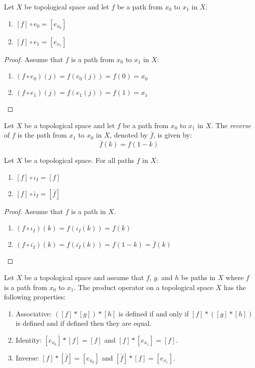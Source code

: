 \documentclass[letterpaper,12pt,fleqn]{article}
\renewcommand{\i}{\iota}
\begin{document}
\begin{lemma}
  Let \(X\) be topological space and let \(f\) be a path from \(x_0\) to \(x_1\) in \(X\):
  \begin{enumerate}
  \item \([f]\circ e_0=[e_{x_0}]\)
  \item \([f]\circ e_1=[e_{x_1}]\)
  \end{enumerate}
\end{lemma}

\begin{proof}
  Assume that \(f\) is a path from \(x_0\) to \(x_1\) in \(X\):
  \begin{enumerate}
    \item \((f\circ e_0)(j)=f(e_0(j))=f(0)=x_0\)
    \item \((f\circ e_1)(j)=f(e_1(j))=f(1)=x_1\)
  \end{enumerate}
\end{proof}

\begin{definition}[Reverse]
  Let \(X\) be a topological space and let \(f\) be a path from \(x_0\) to \(x_1\) in \(X\).  The \emph{reverse} of
  \(f\) is the path from \(x_1\) to \(x_0\) in \(X\), denoted by \(\bar{f}\), is given by:
  \[\bar{f}(k)=f(1-k)\]
\end{definition}

\begin{lemma}
  Let \(X\) be a topological space.  For all paths \(f\) in \(X\):
  \begin{enumerate}
  \item \([f]\circ\i_I=[f]\)
  \item \([f]\circ\bar{\i}_I=[\bar{f}]\)
  \end{enumerate}
\end{lemma}

\begin{proof}
  Assume that \(f\) is a path in \(X\).
  \begin{enumerate}
  \item \((f\circ\i_I)(k)=f(\i_I(k))=f(k)\)
  \item \((f\circ\bar{\i_I})(k)=f(\bar{\i_I}(k))=f(1-k)=\bar{f}(k)\)
  \end{enumerate}
\end{proof}

\begin{theorem}
  Let \(X\) be a topological space and assume that \(f\), \(g\). and \(h\) be paths in \(X\) where \(f\) is a path
  from \(x_0\) to \(x_1\).  The product operator on a topological space \(X\) has the following properties:
  \begin{enumerate}
  \item Associative: \(([f]*[g])*[h]\) is defined if and only if \([f]*([g]*[h])\) is defined and if defined then
    they are equal.
  \item Identity: \([e_{x_0}]*[f]=[f]\) and \([f]*[e_{x_1}]=[f]\).
  \item Inverse: \([f]*[\bar{f}]=[e_{x_0}]\) and \([\bar{f}]*[f]=[e_{x_1}]\).
  \end{enumerate}
\end{theorem}
\end{document}
